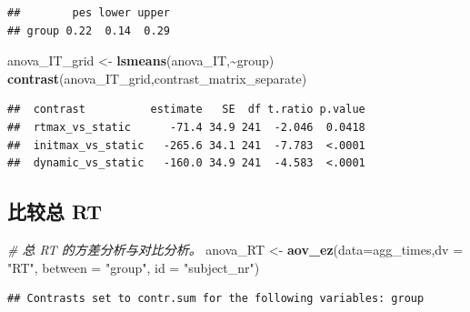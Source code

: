 \documentclass[
]{article}
\newenvironment{Shaded}{\begin{snugshade}}{\end{snugshade}}
\newcommand{\AttributeTok}[1]{\textcolor[rgb]{0.13,0.29,0.53}{#1}}
\newcommand{\CommentTok}[1]{\textcolor[rgb]{0.56,0.35,0.01}{\textit{#1}}}
\newcommand{\DecValTok}[1]{\textcolor[rgb]{0.00,0.00,0.81}{#1}}
\newcommand{\FunctionTok}[1]{\textcolor[rgb]{0.13,0.29,0.53}{\textbf{#1}}}
\newcommand{\NormalTok}[1]{#1}
\newcommand{\OtherTok}[1]{\textcolor[rgb]{0.56,0.35,0.01}{#1}}
\newcommand{\SpecialCharTok}[1]{\textcolor[rgb]{0.81,0.36,0.00}{\textbf{#1}}}
\newcommand{\StringTok}[1]{\textcolor[rgb]{0.31,0.60,0.02}{#1}}
\begin{document}
\begin{Shaded}
\end{Shaded}

\begin{verbatim}
##        pes lower upper
## group 0.22  0.14  0.29
\end{verbatim}

\begin{Shaded}
\begin{Highlighting}[]
\NormalTok{anova\_IT\_grid }\OtherTok{\textless{}{-}} \FunctionTok{lsmeans}\NormalTok{(anova\_IT,}\SpecialCharTok{\textasciitilde{}}\NormalTok{group)}
\FunctionTok{contrast}\NormalTok{(anova\_IT\_grid,contrast\_matrix\_separate)}
\end{Highlighting}
\end{Shaded}

\begin{verbatim}
##  contrast          estimate   SE  df t.ratio p.value
##  rtmax_vs_static      -71.4 34.9 241  -2.046  0.0418
##  initmax_vs_static   -265.6 34.1 241  -7.783  <.0001
##  dynamic_vs_static   -160.0 34.9 241  -4.583  <.0001
\end{verbatim}

\subsection{比较总 RT}\label{ux6bd4ux8f83ux603b-rt}

\begin{Shaded}
\begin{Highlighting}[]
\CommentTok{\# 总 RT 的方差分析与对比分析。}
\NormalTok{anova\_RT }\OtherTok{\textless{}{-}} \FunctionTok{aov\_ez}\NormalTok{(}\AttributeTok{data=}\NormalTok{agg\_times,}\AttributeTok{dv =} \StringTok{"RT"}\NormalTok{, }\AttributeTok{between =} \StringTok{"group"}\NormalTok{, }\AttributeTok{id =} \StringTok{"subject\_nr"}\NormalTok{)}
\end{Highlighting}
\end{Shaded}

\begin{verbatim}
## Contrasts set to contr.sum for the following variables: group
\end{verbatim}
\end{document}

